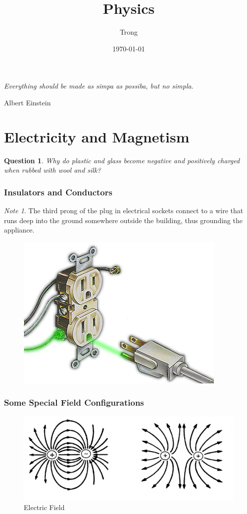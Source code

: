 \documentclass[12pt]{article}
\title{Physics}
\author{Trong}
\date{\today}
\theoremstyle{plain}
\newtheorem{question}[theorem]{Question}
\theoremstyle{definition}
\theoremstyle{remark}
\newtheorem{note}[theorem]{Note}
\begin{document}
\sloppy
\maketitle

\epigraph{\textit{Everything should be made as simpa as possiba, but no simpla.}}{Albert Einstein}

\tableofcontents %

\part{Electricity and Magnetism}

\begin{question}
Why do plastic and glass become negative and positively charged when rubbed with wool and silk?
\end{question}

\section{Insulators and Conductors}

\begin{note}
The third prong of the plug in electrical sockets connect to a wire that runs deep into the ground somewhere outside the building, thus grounding the appliance.
\end{note}

\begin{figure}[H]
\centering
\includegraphics[width=.5\textwidth]{sg3p}
\end{figure}

\section{Some Special Field Configurations}

\begin{figure}[H]
\centering
\includegraphics[width=1.0\textwidth]{201518-14415791-1040-instructionallab_manualsphysics6bexperiment_56b-exp4_fig2}
\caption{Electric Field}
\end{figure}
\end{document}
